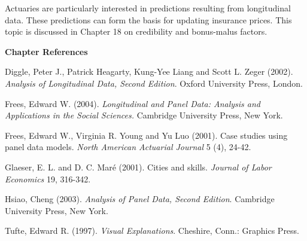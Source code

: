 Actuaries are particularly interested in predictions resulting from
longitudinal data. These predictions can form the basis for updating
insurance prices. This topic is discussed in Chapter 18 on
credibility and bonus-malus factors.



\bigskip

\textbf{Chapter References}

\begin{multicols}{2}


Diggle, Peter J., Patrick Heagarty, Kung-Yee Liang and Scott L.
Zeger (2002). \textit{Analysis of Longitudinal Data, Second
Edition}. Oxford University Press, London.

Frees, Edward W. (2004). \textit{Longitudinal and Panel Data:
Analysis and Applications in the Social Sciences.} Cambridge
University Press, New York.

Frees, Edward W., Virginia R. Young and Yu Luo (2001). Case studies
using panel data models. \emph{North American Actuarial Journal} 5
(4), 24-42.

Glaeser, E. L. and D. C. Mar\'{e} (2001). Cities and skills.
\emph{Journal of Labor Economics} 19, 316-342.

Hsiao, Cheng (2003). \textit{ Analysis of Panel Data, Second
Edition}. Cambridge University Press, New York.

Tufte, Edward R. (1997). \emph{Visual Explanations}. Cheshire,
Conn.: Graphics Press.





\end{multicols}
